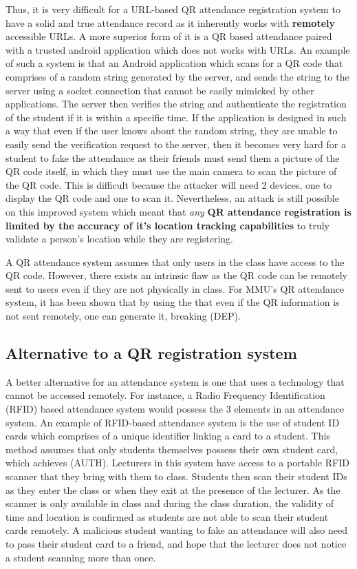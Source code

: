 \documentclass[runningheads]{llncs}
\begin{document}
Thus, it is very difficult for a URL-based QR attendance registration system to have a solid and true attendance record as it inherently works with \textbf{remotely} accessible URLs. A more superior form of it is a QR based attendance paired with a trusted android application which does not works with URLs. An example of such a system is that an Android application which scans for a QR code that comprises of a random string generated by the server, and sends the string to the server using a socket connection that cannot be easily mimicked by other applications. The server then verifies the string and authenticate the registration of the student if it is within a specific time. If the application is designed in such a way that even if the user knows about the random string, they are unable to easily send the verification request to the server, then it becomes very hard for a student to fake the attendance as their friends must send them a picture of the QR code itself, in which they must use the main camera to scan the picture of the QR code. This is difficult because the attacker will need 2 devices, one to display the QR code and one to scan it. Nevertheless, an attack is still possible on this improved system which meant that \textit{any} \textbf{QR attendance registration is limited by the accuracy of it's location tracking capabilities} to truly validate a person's location while they are registering. 

A QR attendance system assumes that only users in the class have access to the QR code. However, there exists an intrinsic flaw as the QR code can be remotely sent to users even if they are not physically in class. For MMU's QR attendance system, it has been shown that by using the \scanattack{} that even if the QR information is not sent remotely, one can generate it, breaking (DEP).

\clearpage{}

\subsection{Alternative to a QR registration system}
A better alternative for an attendance system is one that uses a technology that cannot be accessed remotely. For instance, a Radio Frequency Identification (RFID) based attendance system would possess the 3 elements in an attendance system. An example of RFID-based attendance system is the use of student ID cards which comprises of a unique identifier linking a card to a student. This method assumes that only students themselves possess their own student card, which achieves (AUTH). Lecturers in this system have access to a portable RFID scanner that they bring with them to class. Students then scan their student IDs as they enter the class or when they exit at the presence of the lecturer. As the scanner is only available in class and during the class duration, the validity of time and location is confirmed as students are not able to scan their student cards remotely. A malicious student wanting to fake an attendance will also need to pass their student card to a friend, and hope that the lecturer does not notice a student scanning more than once.
\end{document}
